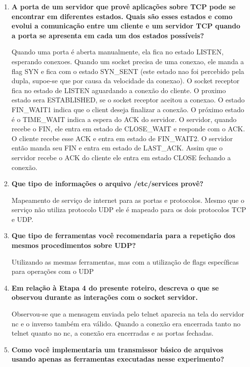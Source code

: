 \begin{enumerate}
  \item \textbf{A porta de um servidor que provê aplicações sobre TCP pode se encontrar em diferentes
    estados. Quais são esses estados e como evolui a comunicação entre um cliente e um
  servidor TCP quando a porta se apresenta em cada um dos estados possíveis?}

  Quando uma porta é aberta manualmente, ela fica no estado LISTEN, esperando conexoes.
  Quando um socket precisa de uma conexao, ele manda a flag SYN e fica com o estado
  SYN\_SENT (este estado nao foi percebido pela dupla, supoe-se que por causa da velocidade da
  conexao). O socket receptor fica no estado de LISTEN aguardando a conexão do cliente.
  O proximo estado sera ESTABLISHED, se o socket receptor aceitou a conexao.
  O estado FIN\_WAIT1 indica que o client deseja finalizar a conexão. O próximo estado é o 
  TIME\_WAIT indica a espera do ACK do servidor. O servidor, quando recebe o FIN, ele entra em
  estado de CLOSE\_WAIT e responde com o ACK. O cliente recebe esse ACK e entra em estado de
  FIN\_WAIT2. O servidor então manda seu FIN e entra em estado de LAST\_ACK. Assim que o servidor
  recebe o ACK do cliente ele entra em estado CLOSE fechando a conexão.

  \item \textbf{Que tipo de informações o arquivo /etc/services provê?}

  Mapeamento de serviço de internet para as portas e protocolos. Mesmo que o serviço não utiliza
  protocolo UDP ele é mapeado para os dois protocolos TCP e UDP.

  \item \textbf{Que tipo de ferramentas você recomendaria para a repetição dos mesmos procedimentos
    sobre UDP?}

  Utilizando as mesmas ferramentas, mas com a utilização de flags específicas para operações com o UDP

  \item \textbf{Em relação à Etapa 4 do presente roteiro, descreva o que se observou durante as interações
    com o socket servidor.}

  Observou-se que a mensagem enviada pelo telnet aparecia na tela do servidor nc e o inverso também
  era válido. Quando a conexão era encerrada tanto no telnet quanto no nc, a conexão era encerradas e as
  portas fechadas.

  \item \textbf{Como você implementaria um transmissor básico de arquivos usando apenas as ferramentas
    executadas nesse experimento?}


\end{enumerate}
